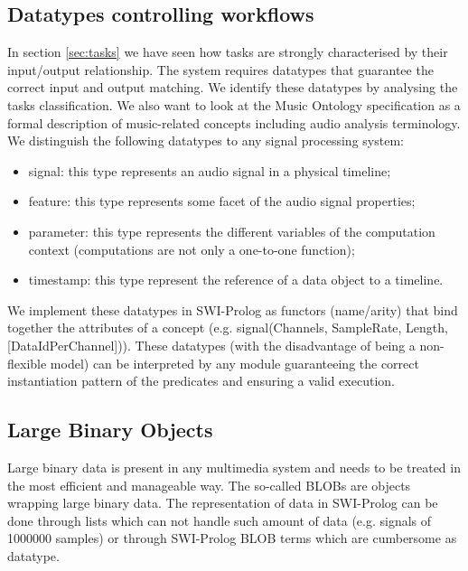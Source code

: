 \documentclass[runningheads]{llncs}
\begin{document}
\subsection{Datatypes controlling workflows}\label{subsec:datatypes}

In section \ref{sec:tasks} we have seen how tasks are strongly characterised by their input/output relationship. The system requires datatypes that guarantee the correct input and output matching. We identify these datatypes by analysing the tasks classification. We also want to look at the Music Ontology specification \cite{mo} as a formal description of music-related concepts including audio analysis terminology. We distinguish the following datatypes to any signal processing system:

\begin{itemize}
 \item signal: this type represents an audio signal in a physical timeline;
 \item feature: this type represents some facet of the audio signal properties;
 \item parameter: this type represents the different variables of the computation context (computations are not only a one-to-one function);
 \item timestamp: this type represent the reference of a data object to a timeline.
\end{itemize}

We implement these datatypes in SWI-Prolog as functors (name/arity) that bind together the attributes of a concept (e.g. signal(Channels, SampleRate, Length, [DataIdPerChannel])). These datatypes (with the disadvantage of being a non-flexible model) can be interpreted by any module guaranteeing the correct instantiation pattern of the predicates and ensuring a valid execution.

\subsection{Large Binary Objects}\label{subsec:blobs}

Large binary data is present in any multimedia system and needs to be treated in the most efficient and manageable way. The so-called BLOBs are objects wrapping large binary data. The representation of data in SWI-Prolog can be done through lists which can not handle such amount of data (e.g. signals of 1000000 samples) or through SWI-Prolog BLOB terms which are cumbersome as datatype.
\end{document}
